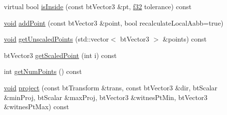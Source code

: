 \begin{DoxyCompactItemize}
\item 
virtual bool \mbox{\hyperlink{classnjli_1_1_physics_shape_convex_hull_aa36afe5a7ad06f0195e3400375a99974}{is\+Inside}} (const bt\+Vector3 \&pt, \mbox{\hyperlink{_util_8h_a5f6906312a689f27d70e9d086649d3fd}{f32}} tolerance) const
\item 
\mbox{\hyperlink{_thread_8h_af1e856da2e658414cb2456cb6f7ebc66}{void}} \mbox{\hyperlink{classnjli_1_1_physics_shape_convex_hull_a4d739444321a865b367a2094686ce14d}{add\+Point}} (const bt\+Vector3 \&point, bool recalculate\+Local\+Aabb=true)
\item 
\mbox{\hyperlink{_thread_8h_af1e856da2e658414cb2456cb6f7ebc66}{void}} \mbox{\hyperlink{classnjli_1_1_physics_shape_convex_hull_a6308f57aaa90f995867be22532bfcb02}{get\+Unscaled\+Points}} (std\+::vector$<$ bt\+Vector3 $>$ \&points) const
\item 
bt\+Vector3 \mbox{\hyperlink{classnjli_1_1_physics_shape_convex_hull_a9faf016dea8118ebd6b321f84cd8cecf}{get\+Scaled\+Point}} (int i) const
\item 
int \mbox{\hyperlink{classnjli_1_1_physics_shape_convex_hull_a1dffedec65f0094774fdee81709f6123}{get\+Num\+Points}} () const
\item 
\mbox{\hyperlink{_thread_8h_af1e856da2e658414cb2456cb6f7ebc66}{void}} \mbox{\hyperlink{classnjli_1_1_physics_shape_convex_hull_a7fa7815ca0dcd22b8518e2800104494c}{project}} (const bt\+Transform \&trans, const bt\+Vector3 \&dir, bt\+Scalar \&min\+Proj, bt\+Scalar \&max\+Proj, bt\+Vector3 \&witnes\+Pt\+Min, bt\+Vector3 \&witnes\+Pt\+Max) const
\end{DoxyCompactItemize}
